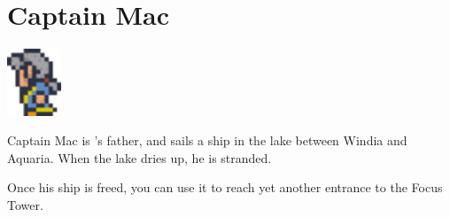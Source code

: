 \section{Captain Mac}
\label{char:mac}

\includegraphics[height=2cm,keepaspectratio]{./resources/chars/mac}

Captain Mac is 's father, and sails a ship in the lake between Windia and Aquaria. When the lake dries up, he is stranded.

Once his ship is freed, you can use it to reach yet another entrance to the Focus Tower.
